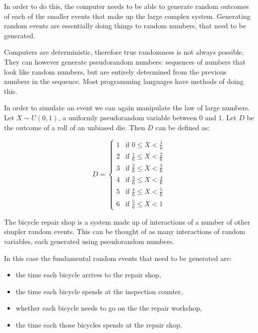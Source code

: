 In order to do this, the computer needs to be able to generate random outcomes
of each of the smaller events that make up the large complex system. Generating
random events are essentially doing things to random numbers, that need to be
generated.

Computers are deterministic, therefore true randomness is not always possible.
They can however generate pseudorandom numbers: sequences of numbers that look
like random numbers, but are entirely determined from the
previous numbers in the sequence. Most programming languages have methods of
doing this.

In order to simulate an event we can again manipulate the law of large numbers.
Let $X \sim U(0, 1)$, a uniformly pseudorandom variable between 0 and 1.
Let $D$ be the outcome of a roll of an unbiased die. Then $D$ can be defined as:

\begin{equation}
D =
  \begin{cases}
    1 & \text{if } 0 \leq X < \frac{1}{6}\\
    2 & \text{if } \frac{1}{6} \leq X < \frac{2}{6}\\
    3 & \text{if } \frac{2}{6} \leq X < \frac{3}{6}\\
    4 & \text{if } \frac{3}{6} \leq X < \frac{4}{6}\\
    5 & \text{if } \frac{4}{6} \leq X < \frac{5}{6}\\
    6 & \text{if } \frac{5}{6} \leq X < 1
  \end{cases}
\end{equation}

The bicycle repair shop is a system made up of interactions of a number of other
simpler random events. This can be thought of as many interactions of random
variables, each generated using pseudorandom numbers.

In this case the fundamental random events that need to be generated are:
\begin{itemize}
  \item the time each bicycle arrives to the repair shop,
  \item the time each bicycle spends at the inspection counter,
  \item whether each bicycle needs to go on the the repair workshop,
  \item the time each those bicycles spends at the repair shop.
\end{itemize}

